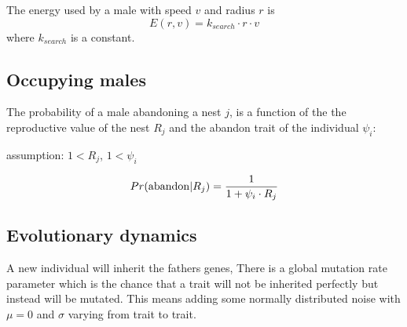 \documentclass[a4paper,11pt]{article}
\begin{document}

The energy used by a male with speed $v$ and radius $r$ is 
\begin{equation}
    E(r,v) = k_{search} \cdot r \cdot v
\end{equation}
where $k_{search}$ is a constant.


\subsection{Occupying males}
The probability of a male abandoning a nest $j$, is a function of the  the reproductive value of the nest $R_j$ and the abandon trait of the individual $\psi_i$: 

assumption: $1 < R_j$,  $1 < \psi_i$

\begin{equation} \label{eq:abandon}
    Pr({\rm abandon} | R_j ) = \frac{1}{1 + \psi_i \cdot R_j}
\end{equation}


\subsection{Evolutionary dynamics}

A new individual will inherit the fathers genes,
There is a global mutation rate parameter which is the chance that a trait will not be inherited perfectly but instead will be mutated.
This means adding some normally distributed noise with $\mu = 0$ and $\sigma$ varying from trait to trait.
\end{document}
